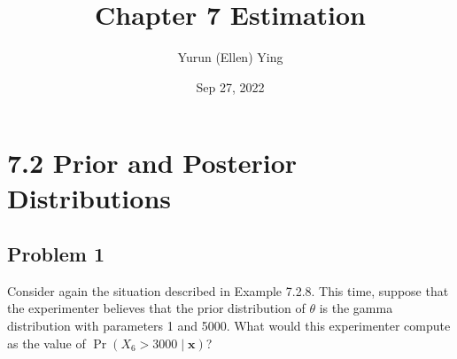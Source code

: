 \documentclass{article}
\title{Chapter 7 Estimation}
\author{Yurun (Ellen) Ying}
\date{Sep 27, 2022}
\begin{document}
\maketitle


\section*{7.2 Prior and Posterior Distributions}

\subsection*{Problem 1}
Consider again the situation described in Example 7.2.8. This time, suppose that the experimenter believes that the prior distribution of $\theta$ is the gamma distribution with parameters 1 and 5000. What would this experimenter compute as the value of $\Pr(X_6 > 3000 \mid \boldsymbol{x})$?

\
\end{document}

